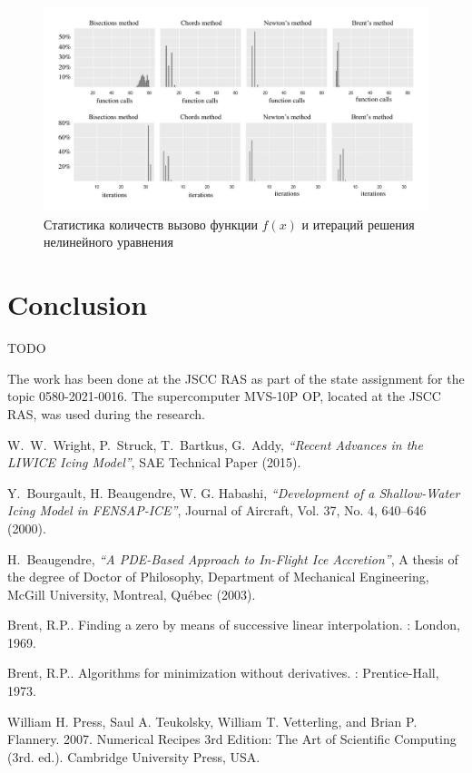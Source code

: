 \documentclass[
11pt,%
tightenlines,%
twoside,%
onecolumn,%
nofloats,%
nobibnotes,%
nofootinbib,%
superscriptaddress,%
noshowpacs,%
centertags]%
{revtex4}
\begin{document}
\begin{figure}[h!]
\setcaptionmargin{5mm}
\onelinecaptionstrue
\includegraphics[width=1\textwidth]{pics/stat.pdf}
\caption{Статистика количеств вызово функции $f(x)$ и итераций решения нелинейного уравнения}\label{fig:stat}
\end{figure}

\section{Conclusion}

TODO

\begin{acknowledgments}
The work has been done at the JSCC RAS as part of the state assignment for the topic 0580-2021-0016.
The supercomputer MVS-10P OP, located at the JSCC RAS, was used during the research.
\end{acknowledgments}

\begin{thebibliography}{99}

W.~W.~Wright, P.~Struck, T.~Bartkus, G.~Addy, {\it ``Recent Advances in the LIWICE Icing Model''}, SAE Technical Paper (2015).

Y.~Bourgault, H. Beaugendre, W. G. Habashi, {\it ``Development of a Shallow-Water Icing Model in FENSAP-ICE''}, Journal of Aircraft, Vol. 37, No. 4, 640--646 (2000).

H.~Beaugendre, {\it ``A PDE-Based Approach to In-Flight Ice Accretion''}, A thesis of the degree of Doctor of Philosophy, Department of Mechanical Engineering, McGill University, Montreal, Qu\'ebec (2003).

Brent, R.P.. Finding a zero by means of successive linear interpolation. : London, 1969.

Brent, R.P.. Algorithms for minimization without derivatives. : Prentice-Hall, 1973.

William H. Press, Saul A. Teukolsky, William T. Vetterling, and Brian P. Flannery. 2007. Numerical Recipes 3rd Edition: The Art of Scientific Computing (3rd. ed.). Cambridge University Press, USA.


\end{thebibliography}
\end{document}
